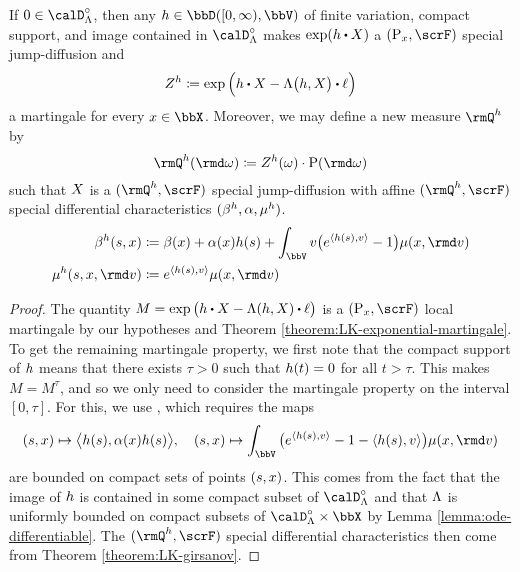 \begin{theorem}
  \label{theorem:exponential-martingale}
  If $0 \in \odeSpace^\circ$, then any $\twistFunc \in \pathSpace{[0,\infty)}{\vecSpace}$ of finite variation, compact support, and image contained in $\odeSpace^\circ$ makes $\exp(\twistFunc \shortInt \X)$ a $(\Prb_\stateVar, \scrF)$ special jump-diffusion and
  \begin{equation*}
    \mgDensity^\twistFunc \defeq \exp\Big( \twistFunc \shortInt \X - \ode\big(\twistFunc, \X\big) \shortInt \leb \Big)
  \end{equation*}
  a martingale for every $\stateVar \in \stateSpace$.
  Moreover, we may define a new measure $\mgPrb^\twistFunc$ by
  \begin{equation*}
    \mgPrb^\twistFunc(\rmd\omega) \defeq \mgDensity^\twistFunc(\omega) \cdot \Prb(\rmd\omega)
  \end{equation*}
  such that $X$ is a $(\mgPrb^\twistFunc, \scrF)$ special jump-diffusion with affine $(\mgPrb^\twistFunc, \scrF)$ special differential characteristics $(\beta^h, \alpha, \mu^h)$.
  \begin{align*}
    \affDrift^\twistFunc(s, \stateVar) &\defeq \affDrift(\stateVar) + \affDiff(\stateVar) \twistFunc(s) + \int_\vecSpace \markVar \big(e^\prj{\twistFunc(s)}{\markVar} -1 \big) \affJump(\stateVar, \rmd\markVar) \\
    \affJump^\twistFunc(s, \stateVar, \rmd\markVar) &\defeq e^\prj{\twistFunc(s)}{\markVar} \affJump(\stateVar, \rmd\markVar)
  \end{align*}
\end{theorem}
\begin{proof}
  The quantity $M = \exp\big(\twistFunc \shortInt \X - \ode(\twistFunc, \X) \shortInt \leb \big)$ is a $(\Prb_\stateVar, \scrF)$ local martingale by our hypotheses and Theorem \ref{theorem:LK-exponential-martingale}.
  To get the remaining martingale property, we first note that the compact support of $h$ means that there exists $\tau > 0$ such that $h(t) = 0$ for all $t > \tau$.
  This makes $M = M^\tau$, and so we only need to consider the martingale property on the interval $[0,\tau]$.
  For this, we use \cite[Theorem 2.6]{spreij2010}, which requires the maps
  \begin{equation*}
    (s, \stateVar) \mapsto \bprj{\twistFunc(s)}{\affDiff(\stateVar)\twistFunc(s)}, \quad 
    (s, \stateVar) \mapsto \int_\vecSpace \big( e^\prj{\twistFunc(s)}{\markVar} - 1 - \prj{\twistFunc(s)}{\markVar} \big) \affJump(\stateVar, \rmd\markVar)
  \end{equation*}
  are bounded on compact sets of points $(s, x)$.
  This comes from the fact that the image of $h$ is contained in some compact subset of $\odeSpace^\circ$ and that $\Lambda$ is uniformly bounded on compact subsets of $\odeSpace^\circ \times \stateSpace$ by Lemma \ref{lemma:ode-differentiable}.
  The $(\mgPrb^\twistFunc, \scrF)$ special differential characteristics then come from Theorem \ref{theorem:LK-girsanov}.
\end{proof}
